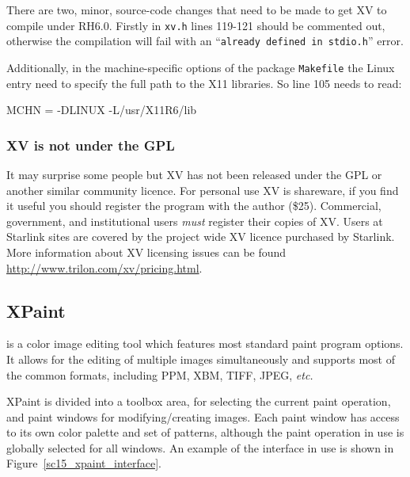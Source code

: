 \documentclass[twoside,11pt]{starlink}
\begin{document}
There are two, minor, source-code changes that need to be made to get
XV to compile under RH6.0. Firstly in \texttt{xv.h} lines 119-121 should
be commented out, otherwise the compilation will fail with an ``\texttt{already defined in stdio.h}'' error. \normalsize

Additionally, in the machine-specific options of the package \texttt{Makefile} the Linux entry need to specify the full path to the X11
libraries. So line 105 needs to read:

\begin{terminalv}
MCHN = -DLINUX -L/usr/X11R6/lib
\end{terminalv}

\subsubsection{XV is \textbf{not} under the GPL}

It may surprise some people but XV has not been released under the GPL
or another similar community licence. For personal use XV is
shareware, if you find it useful you should register the program with
the author (\$25). Commercial, government, and institutional users
\emph{must} register their copies of XV. Users at Starlink sites are
covered by the project wide XV licence purchased by Starlink. More
information about XV licensing issues can be found
\url{http://www.trilon.com/xv/pricing.html}.

\subsection{XPaint\label{sc15_xpaint}}

is a color image editing tool which features most standard paint
program options. It allows for the editing of multiple images
simultaneously and supports most of the common formats, including PPM,
XBM, TIFF, JPEG, \emph{etc.}

XPaint is divided into a toolbox area, for selecting the current paint
operation, and paint windows for modifying/creating images. Each paint
window has access to its own color palette and set of patterns,
although the paint operation in use is globally selected for all
windows. An example of the interface in use is shown in
Figure~\ref{sc15_xpaint_interface}.

\end{document}
